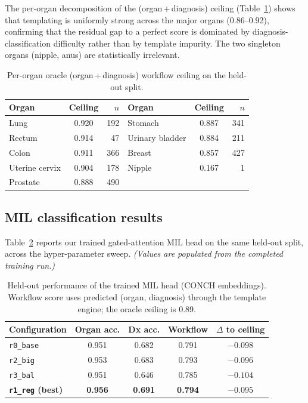 \documentclass[11pt,a4paper]{article}
\newcommand{\code}[1]{\texttt{\small #1}}
\begin{document}
The per-organ decomposition of the (organ\,+\,diagnosis) ceiling (Table~\ref{tab:oracle_organ})
shows that templating is uniformly strong across the major organs (0.86--0.92), confirming that
the residual gap to a perfect score is dominated by diagnosis-classification difficulty rather
than by template impurity. The two singleton organs (nipple, anus) are statistically
irrelevant.

\begin{table}[h]
\centering
\caption{Per-organ oracle (organ\,+\,diagnosis) workflow ceiling on the held-out split.}
\label{tab:oracle_organ}
\begin{tabular}{lcr@{\hspace{2.5em}}lcr}
\toprule
Organ & Ceiling & $n$ & Organ & Ceiling & $n$ \\
\midrule
Lung           & 0.920 & 192 & Stomach         & 0.887 & 341 \\
Rectum         & 0.914 &  47 & Urinary bladder & 0.884 & 211 \\
Colon          & 0.911 & 366 & Breast          & 0.857 & 427 \\
Uterine cervix & 0.904 & 178 & Nipple          & 0.167 &   1 \\
Prostate       & 0.888 & 490 & & & \\
\bottomrule
\end{tabular}
\end{table}

\subsection{MIL classification results}
Table~\ref{tab:mil} reports our trained gated-attention MIL head on the same held-out split,
across the hyper-parameter sweep. \emph{(Values are populated from the completed training
run.)}

\begin{table}[h]
\centering
\caption{Held-out performance of the trained MIL head (CONCH embeddings). Workflow score uses
predicted (organ, diagnosis) through the template engine; the oracle ceiling is 0.89.}
\label{tab:mil}
\begin{tabular}{lcccc}
\toprule
Configuration & Organ acc. & Dx acc. & Workflow & $\Delta$ to ceiling \\
\midrule
\code{r0\_base} & 0.951 & 0.682 & 0.791 & $-0.098$ \\
\code{r2\_big}  & 0.953 & 0.683 & 0.793 & $-0.096$ \\
\code{r3\_bal}  & 0.951 & 0.646 & 0.785 & $-0.104$ \\
\midrule
\textbf{\code{r1\_reg} (best)} & \textbf{0.956} & \textbf{0.691} & \textbf{0.794} & $\mathbf{-0.095}$ \\
\bottomrule
\end{tabular}
\end{table}
\end{document}
